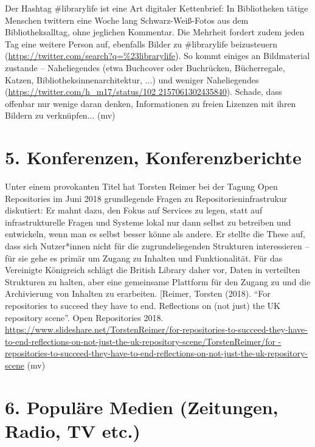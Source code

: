 \documentclass[a4paper,
fontsize=11pt,
oneside,
numbers=noperiodatend,
parskip=half-,
bibliography=totoc,
final
]{scrartcl}
\begin{document}
Der Hashtag \#librarylife ist eine Art digitaler Kettenbrief: In
Bibliotheken tätige Menschen twittern eine Woche lang Schwarz-Weiß-Fotos
aus dem Bibliotheksalltag, ohne jeglichen Kommentar. Die Mehrheit
fordert zudem jeden Tag eine weitere Person auf, ebenfalls Bilder zu
\#librarylife beizusteuern
(\url{https://twitter.com/search?q=\%23librarylife}). So kommt einiges
an Bildmaterial zustande -- Naheliegendes (etwa Buchcover oder
Buchrücken, Bücherregale, Katzen, Bibliotheksinnenarchitektur, ...) und
weniger Naheliegendes
(\href{https://twitter.com/h_m17/status/1022157061302435840}{https://twitter.com/h\_m17/status/102 2157061302435840}). Schade,
dass offenbar nur wenige daran denken, Informationen zu freien Lizenzen
mit ihren Bildern zu verknüpfen... (mv)

\hypertarget{konferenzen-konferenzberichte}{%
\section{5. Konferenzen,
Konferenzberichte}\label{konferenzen-konferenzberichte}}

Unter einem provokanten Titel hat Torsten Reimer bei der Tagung Open
Repositories im Juni 2018 grundlegende Fragen zu
Repositorieninfrastrukur diskutiert: Er mahnt dazu, den Fokus auf
Services zu legen, statt auf infrastrukturelle Fragen und Systeme lokal
nur dann selbst zu betreiben und entwickeln, wenn man es selbst besser
könne als andere. Er stellte die These auf, dass sich Nutzer*innen nicht
für die zugrundeliegenden Strukturen interessieren -- für sie gehe es
primär um Zugang zu Inhalten und Funktionalität. Für das Vereinigte
Königreich schlägt die British Library daher vor, Daten in verteilten
Strukturen zu halten, aber eine gemeinsame Plattform für den Zugang zu
und die Archivierung von Inhalten zu erarbeiten. {[}Reimer, Torsten
(2018). \enquote{For repositories to succeed they have to end.
Reflections on (not just) the UK repository scene}. Open Repositories
2018.
\href{https://www.slideshare.net/TorstenReimer/for-repositories-to-succeed-they-have-to-end-reflections-on-not-just-the-uk-repository-scene/TorstenReimer/for-repositories-to-succeed-they-have-to-end-reflections-on-not-just-the-uk-repository-scene}{https://www.slideshare.net/TorstenReimer/for-repositories-to-succeed-they-have-to-end-reflections-on-not-just-the-uk-repository-scene/TorstenReimer/for -repositories-to-succeed-they-have-to-end-reflections-on-not-just-the-uk-repository-scene}
(mv)

\hypertarget{populuxe4re-medien-zeitungen-radio-tv-etc.}{%
\section{6. Populäre Medien (Zeitungen, Radio, TV
etc.)}\label{populuxe4re-medien-zeitungen-radio-tv-etc.}}
\end{document}
